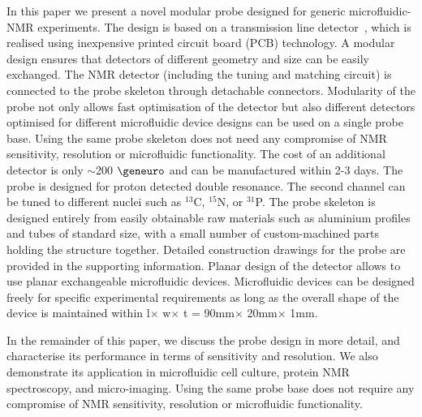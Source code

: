 \documentclass[preprint,12pt]{article}
\begin{document}
In this paper we present a novel modular probe designed for generic microfluidic-NMR experiments. The design is based on a transmission line detector~\cite{stripline_jan,gream_2016}, which is realised using inexpensive printed circuit board (PCB) technology. A modular design ensures that detectors of different geometry and size can be easily exchanged. The NMR detector (including the tuning and matching circuit) is connected to the probe skeleton through detachable connectors. Modularity of the probe not only allows fast optimisation of the detector but also different detectors optimised for different microfluidic device designs can be used on a single probe base. Using the same probe skeleton does not need any compromise of NMR sensitivity, resolution or microfluidic functionality. The cost of an additional detector is only $\sim$200 $\geneuro$ and can be manufactured within 2-3 days. The probe is designed for proton detected double resonance. The second channel can be tuned to different nuclei such as $^{13}$C, $^{15}$N, or $^{31}$P. The probe skeleton is designed entirely from easily obtainable raw materials such as aluminium profiles and tubes of standard size, with a small number of custom-machined parts holding the structure together. Detailed construction drawings for the probe are provided in the supporting information. Planar design of the detector allows to use planar exchangeable microfluidic devices. Microfluidic devices can be designed freely for specific experimental requirements as long as the overall shape of the device is maintained within l$\times$ w$\times$ t = 90mm$\times$ 20mm$\times$ 1mm.\par
In the remainder of this paper, we discuss the probe design in more detail, and characterise its performance in terms of sensitivity and resolution. We also demonstrate its application in microfluidic cell culture, protein NMR spectroscopy, and micro-imaging. Using the same probe base does not require any compromise of NMR sensitivity, resolution or microfluidic functionality.
\end{document}
